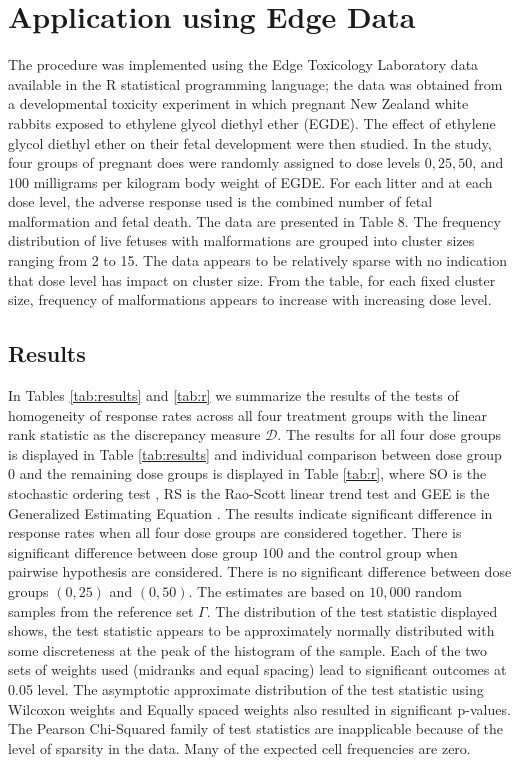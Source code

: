 \documentclass[12pt,oneside]{report}
\theoremstyle{definition}
\theoremstyle{mystyle}
\begin{document}
\section{Application using  Edge Data}
The procedure was implemented using the Edge Toxicology Laboratory data  available in the R statistical programming language;
 the data was obtained from a developmental toxicity experiment in which pregnant New Zealand white rabbits  exposed to ethylene glycol diethyl ether (EGDE). The effect of ethylene glycol diethyl ether on their  fetal development  were then studied. In the study, four groups of pregnant does were randomly assigned to dose levels $0, 25, 50$, and $100$ milligrams per kilogram body weight of EGDE. For each litter and at each dose level, the adverse response used is the combined number of fetal malformation and fetal death.
The data are presented in  Table 8. The frequency distribution  of live fetuses with malformations are grouped into cluster sizes ranging from 2 to 15. The data appears to be relatively sparse with no indication that dose level has impact on cluster size. From the table, for each fixed cluster size, frequency of malformations  appears to increase with increasing dose level.



\subsection{Results}

In Tables \ref{tab:results} and \ref{tab:r} we summarize the results
of the tests of homogeneity of  response rates across all four treatment groups with the linear rank statistic as the  discrepancy measure $\mathcal{D}$. The results for all four dose groups is displayed in Table \ref{tab:results} and individual comparison between dose group $0$  and the remaining dose groups is displayed in Table  \ref{tab:r}, where SO is the stochastic ordering test \cite{aniko}, RS is the Rao-Scott linear trend test \cite{raoscott} and GEE is the Generalized Estimating Equation \cite{gee}. The results indicate significant difference in response rates when all four dose groups are considered together. There is significant difference   between dose group $100$  and the control group when  pairwise  hypothesis are considered. There is  no significant difference between dose groups $(0,25)$ and $(0,50)$. The estimates are based on  $10,000$ random samples from  the reference set $\Gamma$. The distribution of the test statistic displayed  shows, the test statistic appears to be approximately normally distributed  with some discreteness at the peak of the histogram of the sample. Each of the two sets of weights used (midranks and equal spacing) lead to significant outcomes at 0.05 level. The asymptotic approximate distribution of the test statistic using Wilcoxon weights and Equally spaced weights  also resulted in   significant p-values. The Pearson Chi-Squared family of test statistics are inapplicable because of the level of sparsity in the data. Many of the expected cell frequencies are zero. \\
\end{document}
